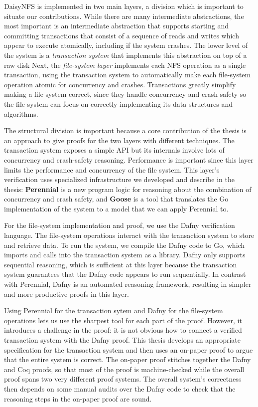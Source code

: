 DaisyNFS is implemented in two main layers, a division which is important to
situate our contributions. While there are many intermediate abstractions, the
most important is an intermediate abstraction that supports starting and
committing transactions that consist of a sequence of reads and writes which
appear to execute atomically, including if the system crashes. The lower level
of the system is a \emph{transaction system} that implements this abstraction on
top of a raw disk Next, the \emph{file-system layer} implements each NFS
operation as a single transaction, using the transaction system to automatically
make each file-system operation atomic for
concurrency and crashes. Transactions greatly simplify making a file
system correct, since they handle concurrency and crash safety so the
file system can focus on correctly implementing its data structures and
algorithms.

The structural division is important because a core contribution of the thesis
is an approach to give proofs for the two layers with different techniques.
The transaction
system exposes a simple API but its internals involve lots of
concurrency and crash-safety reasoning. Performance is important since
this layer limits the performance and concurrency of the file system.
This layer's verification uses specialized infrastructure we developed
and describe in the thesis: \textbf{Perennial} is a new program logic
for reasoning about the combination of concurrency and crash safety, and
\textbf{Goose} is a tool that translates the Go implementation of the
system to a model that we can apply Perennial to.

For the file-system implementation and proof, we use the Dafny
verification language. The file-system operations interact with the
transaction system to store and retrieve data. To run the system, we
compile the Dafny code to Go, which imports and calls into the
transaction system as a library. Dafny only supports sequential
reasoning, which is sufficient at this layer because the transaction
system guarantees that the Dafny code appears to run sequentially. In contrast
with Perennial, Dafny is an automated reasoning framework, resulting in simpler
and more productive proofs in this layer.

Using Perennial for the transaction sytem and Dafny for the file-system
operations lets us use the sharpest tool for each part of the proof. However, it
introduces a challenge in the proof: it is not obvious how to connect a verified
transaction system with the Dafny proof. This thesis develops an appropriate
specification for the transaction system and then uses an on-paper proof to
argue that the entire system is correct. The on-paper proof stitches together
the Dafny and Coq proofs, so that most of the proof is machine-checked while the
overall proof spans two very different proof systems. The overall system's
correctness then depends on some manual audits over the Dafny code to check that
the reasoning steps in the on-paper proof are sound.

